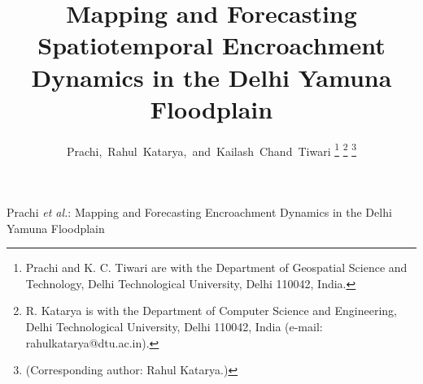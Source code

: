 \documentclass[journal]{IEEEtran}
\begin{document}

\title{Mapping and Forecasting Spatiotemporal Encroachment Dynamics in the Delhi Yamuna Floodplain}

\author{Prachi,~Rahul~Katarya,~and~Kailash~Chand~Tiwari%
\thanks{Prachi and K. C. Tiwari are with the Department of Geospatial Science and Technology, Delhi Technological University, Delhi 110042, India.}%
\thanks{R. Katarya is with the Department of Computer Science and Engineering, Delhi Technological University, Delhi 110042, India (e-mail: rahulkatarya@dtu.ac.in).}%
\thanks{(Corresponding author: Rahul Katarya.)}}

{Prachi \MakeLowercase{\textit{et al.}}: Mapping and Forecasting Encroachment Dynamics in the Delhi Yamuna Floodplain}
\maketitle
\end{document}
